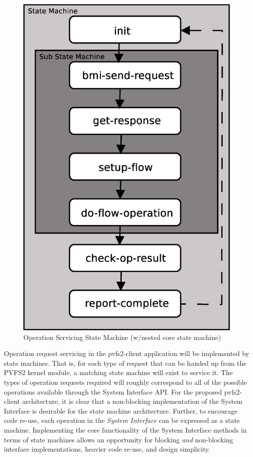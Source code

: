 \documentclass[11pt]{article}
\begin{document}
\begin{figure}
\begin{center}
\includegraphics[scale=0.4]{core-sm.eps}
\end{center}
\caption{Operation Servicing State Machine (w/nested core state machine)}
\label{figure:generic-sm}
\end{figure}

Operation request servicing in the pvfs2-client application will be
implemented by state machines.  That is, for each type of request that
can be handed up from the PVFS2 kernel module, a matching state
machine will exist to service it.  The types of operation requests
required will roughly correspond to all of the possible operations
available through the System Interface API.  For the proposed
pvfs2-client architecture, it is clear that a non-blocking
implementation of the System Interface is desirable for the state
machine architecture.  Further, to encourage code re-use, each
operation in the {\it System Interface} can be expressed as a state
machine.  Implementing the core functionality of the System Interface
methods in terms of state machines allows an opportunity for blocking
{\it and} non-blocking interface implementations, heavier code re-use,
and design simplicity.
\end{document}
